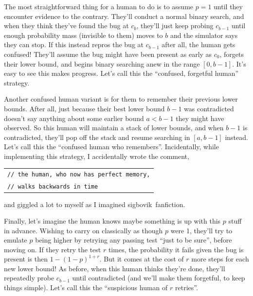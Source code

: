 \documentclass[11pt]{sigplanconf}
\begin{document}
The most straightforward thing for a human to do is to assume $p=1$ until they encounter evidence to the contrary.
They'll conduct a normal binary search, and when they think they've found the bug at $c_b$,
they'll just keep probing $c_{b-1}$ until enough probability mass (invisible to them)
moves to $b$ and the simulator says they can stop.
If this instead repros the bug at $c_{b-1}$ after all, the human gets confused!
They'll assume the bug might have been present as early as $c_0$,
forgets their lower bound, and begins binary searching anew in the range $[0,b-1]$.
It's easy to see this makes progress.
Let's call this the ``confused, forgetful human'' strategy.

Another confused human variant is for them to remember their previous lower bounds.
After all, just because their best lower bound $b-1$ was contradicted
doesn't say anything about some earlier bound $a<b-1$ they might have observed.
So this human will maintain a stack of lower bounds, and when $b-1$ is contradicted,
they'll pop off the stack and resume searching in $[a,b-1]$ instead.
Let's call this the ``confused human who remembers''.
%
Incidentally, while implementing this strategy, I accidentally wrote the comment,
\begin{center}
	\begin{tabular}{l}
		{\tt // the human, who now has perfect memory,} \\
		{\tt // walks backwards in time}
	\end{tabular}
\end{center}
and giggled a lot to myself as I imagined {\birbaslo sigbovik}~fanfiction.


Finally, let's imagine the human knows maybe something is up with this $p$ stuff in advance. %
Wishing to carry on classically as though $p$ were 1,
they'll try to emulate $p$ being higher by retrying any passing test ``just to be sure'', before moving on.
If they retry the test $r$ times,
the probability it fails given the bug is present is then $1-(1-p)^{1+r}$.
But it comes at the cost of $r$ more steps for each new lower bound!
As before, when this human thinks they're done, they'll repeatedly probe $c_{b-1}$ until contradicted
(and we'll make them forgetful, to keep things simple).
Let's call this the ``suspicious human of $r$ retries''.


\end{document}
